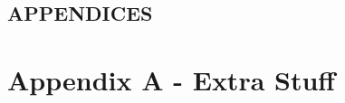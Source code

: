 \begin{center}
	\section*{APPENDICES}
	\setcounter{section}{10}
\end{center}

\section*{Appendix A - Extra Stuff}

